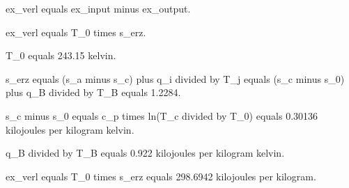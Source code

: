 ex_verl equals ex_input minus ex_output.  

ex_verl equals T_0 times s_erz.  

T_0 equals 243.15 kelvin.  

s_erz equals (s_a minus s_c) plus q_i divided by T_j equals (s_c minus s_0) plus q_B divided by T_B equals 1.2284.  

s_c minus s_0 equals c_p times ln(T_c divided by T_0) equals 0.30136 kilojoules per kilogram kelvin.  

q_B divided by T_B equals 0.922 kilojoules per kilogram kelvin.  

ex_verl equals T_0 times s_erz equals 298.6942 kilojoules per kilogram.